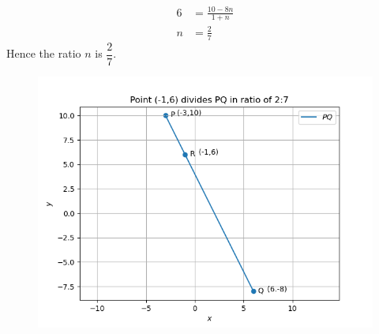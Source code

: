 \documentclass[12pt]{article}
\begin{document}
\begin{enumerate}
\begin{align}
          6 &=\frac{10-8n}{1+n}\\
          n &=\frac{2}{7}
\end{align}
Hence the ratio $n$ is $\dfrac{2}{7}$.
\begin{figure}[!h]
 \begin{center}
  \includegraphics[width=\columnwidth]{figs/fig.png}
 \end{center}
\caption{}
\label{fig:Fig1}
\end{figure}
\end{enumerate}
\end{document}

